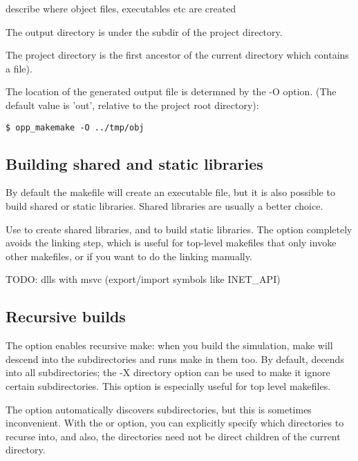 describe where object files, executables etc are created

The output directory is under the  subdir of the project directory.

\begin{note}
The project directory is the first ancestor of the current directory which
contains a  file).
\end{note}

The location of the generated output file is determned by the -O option.
(The default value is 'out', relative to the project root directory):

\begin{verbatim}
$ opp_makemake -O ../tmp/obj
\end{verbatim}



\subsection{Building shared and static libraries}

By default the makefile will create an executable file, but it is also
possible to build shared or static libraries. Shared libraries
are usually a better choice.

Use  to create shared libraries, and 
to build static libraries. The  option completely avoids
the linking step, which is useful for top-level makefiles that only invoke
other makefiles, or if you want to do the linking manually.

TODO: dlls with msvc (export/import symbols like INET\_API)


\subsection{Recursive builds}

The  option enables recursive make: when you build the simulation, make
will descend into the subdirectories and runs make in them too.
By default,  decends into all subdirectories; the -X directory option
can be used to make it ignore certain subdirectories. This option is especially useful
for top level makefiles.

The  option automatically discovers subdirectories, but this
is sometimes inconvenient. With the  or  option,
you can explicitly specify which directories to recurse into, and also,
the directories need not be direct children of the current directory.

